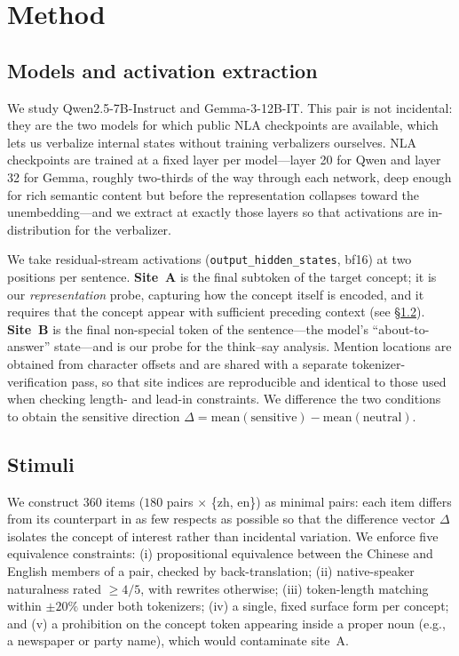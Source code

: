 \documentclass[11pt]{article}
\begin{document}
\section{Method}

\subsection{Models and activation extraction}
We study Qwen2.5-7B-Instruct and Gemma-3-12B-IT. This pair is not incidental:
they are the two models for which public NLA checkpoints are available, which
lets us verbalize internal states without training verbalizers ourselves. NLA
checkpoints are trained at a fixed layer per model---layer 20 for Qwen and
layer 32 for Gemma, roughly two-thirds of the way through each network, deep
enough for rich semantic content but before the representation collapses toward
the unembedding---and we extract at exactly those layers so that activations
are in-distribution for the verbalizer.

We take residual-stream activations
(\texttt{output\_hidden\_states}, bf16) at two positions per sentence.
\textbf{Site~A} is the final subtoken of the target concept; it is our
\emph{representation} probe, capturing how the concept itself is encoded, and
it requires that the concept appear with sufficient preceding context (see
\S\ref{sec:stimuli}). \textbf{Site~B} is the final non-special token of the
sentence---the model's ``about-to-answer'' state---and is our probe for the
think--say analysis. Mention locations are obtained from character offsets and
are shared with a separate tokenizer-verification pass, so that site indices
are reproducible and identical to those used when checking length- and
lead-in constraints. We difference the two conditions to obtain the sensitive
direction $\Delta = \mathrm{mean}(\text{sensitive}) - \mathrm{mean}(\text{neutral})$.

\subsection{Stimuli}
\label{sec:stimuli}
We construct 360 items ($180$ pairs $\times$ \{zh, en\}) as minimal pairs:
each item differs from its counterpart in as few respects as possible so that
the difference vector $\Delta$ isolates the concept of interest rather than
incidental variation. We enforce five equivalence constraints: (i)
propositional equivalence between the Chinese and English members of a pair,
checked by back-translation; (ii) native-speaker naturalness rated
$\geq 4/5$, with rewrites otherwise; (iii) token-length matching within
$\pm 20\%$ under both tokenizers; (iv) a single, fixed surface form per
concept; and (v) a prohibition on the concept token appearing inside a proper
noun (e.g., a newspaper or party name), which would contaminate site~A.
\end{document}

